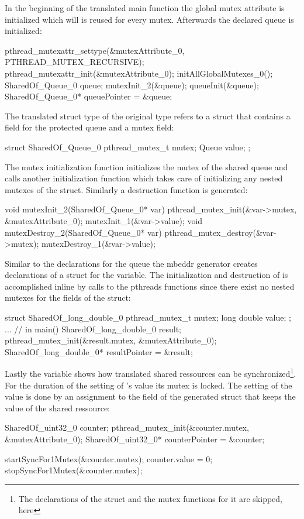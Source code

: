 In the beginning of the translated main function the global mutex attribute is initialized which will is reused for every mutex. Afterwards the declared queue is initialized:
\begin{ccode}
pthread_mutexattr_settype(&mutexAttribute_0, PTHREAD_MUTEX_RECURSIVE); 
pthread_mutexattr_init(&mutexAttribute_0); 
initAllGlobalMutexes_0(); 
SharedOf_Queue_0 queue; 
mutexInit_2(&queue); 
queueInit(&queue); 
SharedOf_Queue_0* queuePointer = &queue;
\end{ccode}
The translated struct type  of the original type  refers to a struct that contains a field for the protected queue and a mutex field:
\begin{ccode}
struct SharedOf_Queue_0 { 
  pthread_mutex_t mutex; 
  Queue value; 
};
\end{ccode}
The mutex initialization function  initializes the mutex of the shared queue and calls another initialization function which takes care of initializing any nested mutexes of the  struct. Similarly a destruction function is generated:
\begin{ccode}
void mutexInit_2(SharedOf_Queue_0* var) { 
  pthread_mutex_init(&var->mutex, &mutexAttribute_0); 
  mutexInit_1(&var->value); 
}
void mutexDestroy_2(SharedOf_Queue_0* var) { 
  pthread_mutex_destroy(&var->mutex);
  mutexDestroy_1(&var->value); 
}      
\end{ccode}
Similar to the declarations for the queue the mbeddr generator creates declarations of a struct for the  variable. The initialization and destruction of  is accomplished inline by calls to the pthreads functions since there exist no nested mutexes for the fields of the struct:
\begin{ccode}
struct SharedOf_long_double_0 { 
  pthread_mutex_t mutex; 
  long double value; 
};
... // in main()
SharedOf_long_double_0 result; 
pthread_mutex_init(&result.mutex, &mutexAttribute_0); 
SharedOf_long_double_0* resultPointer = &result;
\end{ccode}
Lastly the  variable shows how translated shared ressources can be synchronized\footnote{The declarations of the struct and the mutex functions for it are skipped, here}. For the duration of the setting of 's value its mutex is locked. The setting of the value is done by an assignment to the  field of the generated struct that keeps the value of the shared ressource:
\begin{ccode}
SharedOf_uint32_0 counter; 
pthread_mutex_init(&counter.mutex, &mutexAttribute_0); 
SharedOf_uint32_0* counterPointer = &counter;

startSyncFor1Mutex(&counter.mutex); 
{ counter.value = 0; } 
stopSyncFor1Mutex(&counter.mutex);
\end{ccode}

